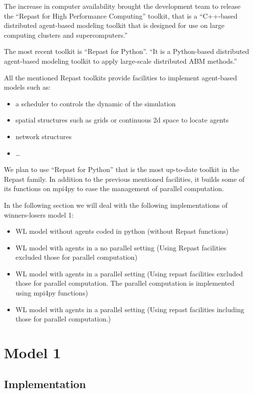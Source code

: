 \documentclass{article}
\providecommand{\tightlist}{%
  \setlength{\itemsep}{0pt}\setlength{\parskip}{0pt}}
\begin{document}
The increase in computer availability brought the development team to release the ``Repast for High Performance Computing'' toolkit, that is a ``C++-based distributed agent-based modeling toolkit that is designed for use on large computing clusters and supercomputers.'' 

The most recent toolkit is ``Repast for Python''. ``It is a Python-based distributed agent-based modeling toolkit to apply large-scale distributed ABM methods.'' 

All the mentioned Repast toolkits provide facilities to implement agent-based models such as:
\begin{itemize}
\tightlist
	\item a scheduler to controls the dynamic of the simulation
	\item spatial structures such as grids or continuous 2d space to locate agents
	\item network structures
	\item \ldots
\end{itemize}

We plan to use ``Repast for Python'' that is the most up-to-date toolkit in the Repast family. In addition to the previous mentioned facilities, it builds some of its functions on mpi4py to ease the management of parallel computation.

In the following section we will deal with the following implementations of winners-losers model 1:
\begin{itemize}
	\item WL model without agents coded in python (without Repast functions)
	\item WL model with agents in a no parallel setting (Using Repast facilities excluded those for parallel computation)
	\item WL model with agents in a parallel setting (Using repast facilities excluded those for parallel computation. The parallel computation is implemented using mpi4py functions)
	\item WL model with agents in a parallel setting (Using repast facilities including those for parallel computation.)
\end{itemize}

\section{Model 1}
\subsection{Implementation}
\end{document}
